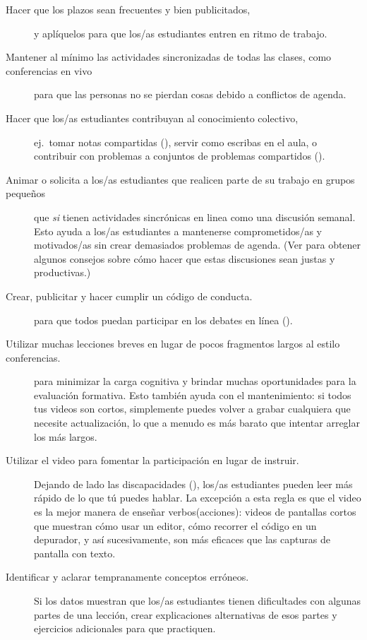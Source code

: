 \begin{description}

\item[Hacer que los plazos sean frecuentes y bien publicitados,]
  y aplíquelos para que los/as estudiantes entren en ritmo de trabajo.

\item[Mantener al mínimo las actividades sincronizadas de todas las clases, como conferencias en vivo]
  para que las personas no se pierdan cosas debido a conflictos de agenda.

\item[Hacer que los/as estudiantes contribuyan al conocimiento colectivo,]
  ej.\ tomar notas compartidas (),
  servir como escribas en el aula,
  o contribuir con problemas a conjuntos de problemas compartidos ().

\item[Animar o solicita a los/as estudiantes que realicen parte de su trabajo en grupos pequeños]
  que \emph{si} tienen actividades sincrónicas en linea
  como una discusión semanal.
  Esto ayuda a los/as estudiantes a mantenerse comprometidos/as y motivados/as sin crear demasiados problemas de agenda.
  (Ver  para obtener algunos consejos sobre cómo hacer que estas discusiones sean justas y productivas.)

\item[Crear, publicitar y hacer cumplir un código de conducta.]
  para que todos puedan participar en los debates en línea ().

\item[Utilizar muchas lecciones breves en lugar de pocos fragmentos largos al estilo conferencias.]
  para minimizar la carga cognitiva
  y brindar muchas oportunidades para la evaluación formativa.
  Esto también ayuda con el mantenimiento:
  si todos tus videos son cortos,
  simplemente puedes volver a grabar cualquiera que necesite actualización,
  lo que a menudo es más barato que intentar arreglar los más largos.

\item[Utilizar el video para fomentar la participación en lugar de instruir.]
  Dejando de lado las discapacidades (),
  los/as estudiantes pueden leer más rápido de lo que tú puedes hablar.
  La excepción a esta regla es que
  el video es la mejor manera de enseñar verbos(acciones):
  videos de pantallas cortos que muestran cómo usar un editor,
  cómo recorrer el código en un depurador,
  y así sucesivamente, son más eficaces que las capturas de pantalla con texto.

\item[Identificar y aclarar tempranamente conceptos erróneos.]
  Si los datos muestran que los/as estudiantes tienen dificultades con algunas partes de una lección,
  crear explicaciones alternativas de esos partes
  y ejercicios adicionales para que practiquen.

\end{description}


